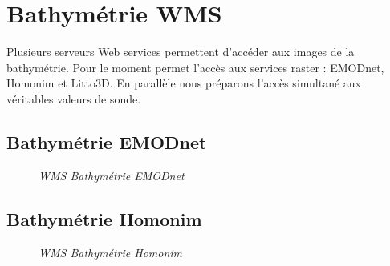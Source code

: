 \section{Bathymétrie WMS}
Plusieurs serveurs Web services permettent d'accéder aux images de la bathymétrie. Pour le moment \nav permet l'accès aux services raster : EMODnet, Homonim et Litto3D. En parallèle nous préparons l'accès simultané aux véritables valeurs de sonde.
\subsection{Bathymétrie EMODnet}
\begin{center}
\begin{figure}[ht]
\caption{\label{bathyEmodnet}\textit{WMS Bathymétrie EMODnet}}
\end{figure}
\end{center}
\subsection{Bathymétrie Homonim}
\begin{center}
\begin{figure}[ht]
\caption{\label{bathyHomonim}\textit{WMS Bathymétrie Homonim}}
\end{figure}
\end{center}
